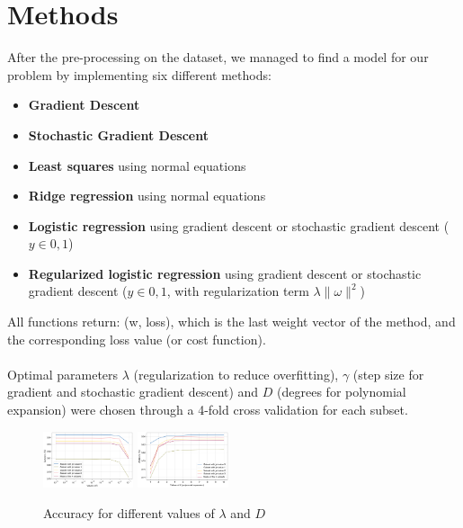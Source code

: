 \documentclass[10pt,conference,compsocconf]{IEEEtran}
\begin{document}
\section{Methods}
After the pre-processing on the dataset, we managed to find a model for our problem by implementing six different methods:
\begin{itemize}
    \item \textbf{Gradient Descent}
    \item \textbf{Stochastic Gradient Descent}
    \item \textbf{Least squares} using normal equations
    \item \textbf{Ridge regression} using normal equations
    \item \textbf{Logistic regression} using gradient descent or stochastic gradient descent ($y \in {0,1}$)
    \item \textbf{Regularized logistic regression} using gradient descent or stochastic gradient descent ($y \in {0,1}$, with regularization term $ \lambda  \| \omega \|^2$)
\end{itemize}
All functions return: (w, loss), which is the last weight vector of the
method, and the corresponding loss value (or cost function).\\
\vspace{0.05cm}\\
Optimal parameters $\lambda$ (regularization to reduce overfitting), $\gamma$ (step size for gradient and stochastic gradient descent) and $D$ (degrees for polynomial expansion) were chosen through a 4-fold cross validation for each subset.
\begin{figure}[h]
    \centering
    \includegraphics[width=0.237\textwidth]{report/lambdas.png}
    \includegraphics[width=0.237\textwidth]{report/degrees.png}
    \caption{Accuracy for different values of $\lambda$ and $D$}
    \label{fig:lambdas}
\end{figure}\\
\end{document}
